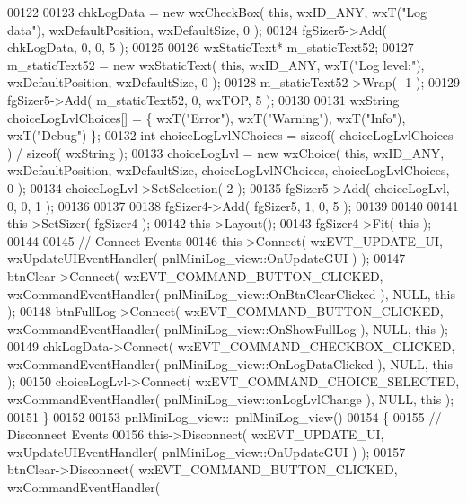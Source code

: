 \begin{DoxyCode}
00122     
00123     chkLogData = \textcolor{keyword}{new} wxCheckBox( \textcolor{keyword}{this}, wxID\_ANY, wxT(\textcolor{stringliteral}{"Log data"}), wxDefaultPosition, wxDefaultSize, 0 );
00124     fgSizer5->Add( chkLogData, 0, 0, 5 );
00125     
00126     wxStaticText* m\_staticText52;
00127     m\_staticText52 = \textcolor{keyword}{new} wxStaticText( \textcolor{keyword}{this}, wxID\_ANY, wxT(\textcolor{stringliteral}{"Log level:"}), wxDefaultPosition, wxDefaultSize,
       0 );
00128     m\_staticText52->Wrap( -1 );
00129     fgSizer5->Add( m\_staticText52, 0, wxTOP, 5 );
00130     
00131     wxString choiceLogLvlChoices[] = \{ wxT(\textcolor{stringliteral}{"Error"}), wxT(\textcolor{stringliteral}{"Warning"}), wxT(\textcolor{stringliteral}{"Info"}), wxT(\textcolor{stringliteral}{"Debug"}) \};
00132     \textcolor{keywordtype}{int} choiceLogLvlNChoices = \textcolor{keyword}{sizeof}( choiceLogLvlChoices ) / \textcolor{keyword}{sizeof}( wxString );
00133     choiceLogLvl = \textcolor{keyword}{new} wxChoice( \textcolor{keyword}{this}, wxID\_ANY, wxDefaultPosition, wxDefaultSize, choiceLogLvlNChoices, 
      choiceLogLvlChoices, 0 );
00134     choiceLogLvl->SetSelection( 2 );
00135     fgSizer5->Add( choiceLogLvl, 0, 0, 1 );
00136     
00137     
00138     fgSizer4->Add( fgSizer5, 1, 0, 5 );
00139     
00140     
00141     this->SetSizer( fgSizer4 );
00142     this->Layout();
00143     fgSizer4->Fit( \textcolor{keyword}{this} );
00144     
00145     \textcolor{comment}{// Connect Events}
00146     this->Connect( wxEVT\_UPDATE\_UI, wxUpdateUIEventHandler( 
      pnlMiniLog_view::OnUpdateGUI ) );
00147     btnClear->Connect( wxEVT\_COMMAND\_BUTTON\_CLICKED, wxCommandEventHandler( 
      pnlMiniLog_view::OnBtnClearClicked ), NULL, \textcolor{keyword}{this} );
00148     btnFullLog->Connect( wxEVT\_COMMAND\_BUTTON\_CLICKED, wxCommandEventHandler( 
      pnlMiniLog_view::OnShowFullLog ), NULL, \textcolor{keyword}{this} );
00149     chkLogData->Connect( wxEVT\_COMMAND\_CHECKBOX\_CLICKED, wxCommandEventHandler( 
      pnlMiniLog_view::OnLogDataClicked ), NULL, \textcolor{keyword}{this} );
00150     choiceLogLvl->Connect( wxEVT\_COMMAND\_CHOICE\_SELECTED, wxCommandEventHandler( 
      pnlMiniLog_view::onLogLvlChange ), NULL, \textcolor{keyword}{this} );
00151 \}
00152 
00153 pnlMiniLog_view::~pnlMiniLog_view()
00154 \{
00155     \textcolor{comment}{// Disconnect Events}
00156     this->Disconnect( wxEVT\_UPDATE\_UI, wxUpdateUIEventHandler( 
      pnlMiniLog_view::OnUpdateGUI ) );
00157     btnClear->Disconnect( wxEVT\_COMMAND\_BUTTON\_CLICKED, wxCommandEventHandler( 

\end{DoxyCode}

